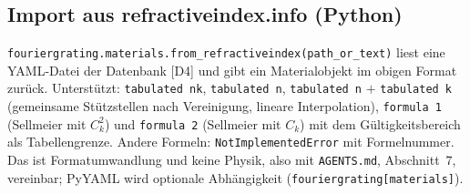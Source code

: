 \subsection{Import aus refractiveindex.info (Python)}
\verb|fouriergrating.materials.from_refractiveindex(path_or_text)| liest eine YAML-Datei der Datenbank [D4] und gibt
ein Materialobjekt im obigen Format zurück. Unterstützt: \verb|tabulated nk|, \verb|tabulated n|,
\verb|tabulated n| $+$ \verb|tabulated k| (gemeinsame Stützstellen nach Vereinigung, lineare Interpolation),
\verb|formula 1| (Sellmeier mit $C_k^2$) und \verb|formula 2| (Sellmeier mit $C_k$) mit dem Gültigkeitsbereich als
Tabellengrenze. Andere Formeln: \verb|NotImplementedError| mit Formelnummer. Das ist Formatumwandlung und keine Physik,
also mit \verb|AGENTS.md|, Abschnitt~7, vereinbar; PyYAML wird optionale Abhängigkeit (\verb|fouriergrating[materials]|).

